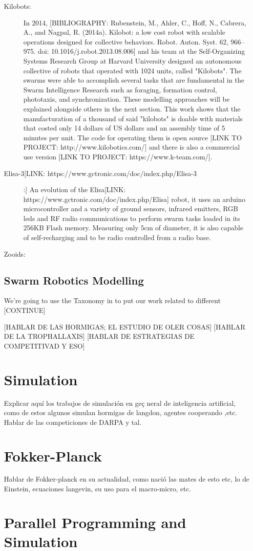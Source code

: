 \begin{description}
\item[Kilobots:] In 2014, [BIBLIOGRAPHY: Rubenstein, M., Ahler, C., Hoff, N., Cabrera, A., and Nagpal, R. (2014a). Kilobot: a low cost robot with scalable operations designed for collective behaviors. Robot. Auton. Syst. 62, 966–975. doi: 10.1016/j.robot.2013.08.006] and his team at the Self-Organizing Systems Research Group at Harvard University designed an autonomous collective of robots that operated with 1024 units, called "Kilobots". The swarms were able to accomplish several tasks that are fundamental in the Swarm Intelligence Research such as foraging, formation control, phototaxis, and synchronization. These modelling approaches will be explained alongside others in the next section. This work shows that the manufacturation of a thousand of said "kilobots" is doable with materials that costed only 14 dollars of US dollars and an assembly time of 5 minutes per unit. The code for operating them is open source [LINK TO PROJECT: http://www.kilobotics.com/] and there is also a commercial use version [LINK TO PROJECT: https://www.k-team.com/].

\item[Elisa-3[LINK: https://www.gctronic.com/doc/index.php/Elisa-3]:] An evolution of the Elisa[LINK: https://www.gctronic.com/doc/index.php/Elisa] robot, it uses an arduino microcontroller and a variety of ground sensors, infrared emitters, RGB leds and RF radio communications to perform swarm tasks loaded in its 256KB Flash memory. Measuring only 5cm of diameter, it is also capable of self-recharging and to be radio controlled from a radio base.

\item[Zooids\cite{E_Zooids}:]

\end{description}

\subsection{Swarm Robotics Modelling}
We're going to use the Taxonomy in \cite{D_Swarm_Applications} to put our work related to different [CONTINUE]

[HABLAR DE LAS HORMIGAS; EL ESTUDIO DE OLER COSAS]
[HABLAR DE LA TROPHALLAXIS]
[HABLAR DE ESTRATEGIAS DE COMPETITIVAD Y ESO]


\section{Simulation}
Explicar aquí los trabajos de simulación en geç
neral de inteligencia artificial, como de estos algunos simulan hormigas de langdon, agentes cooperando ,etc. Hablar de las competiciones de DARPA y tal.

\section{Fokker-Planck}
Hablar de Fokker-planck en su actualidad, como nació las mates de esto etc, lo de Einstein, ecuaciones langevin, su uso para el macro-micro, etc.

\section{Parallel Programming and Simulation}